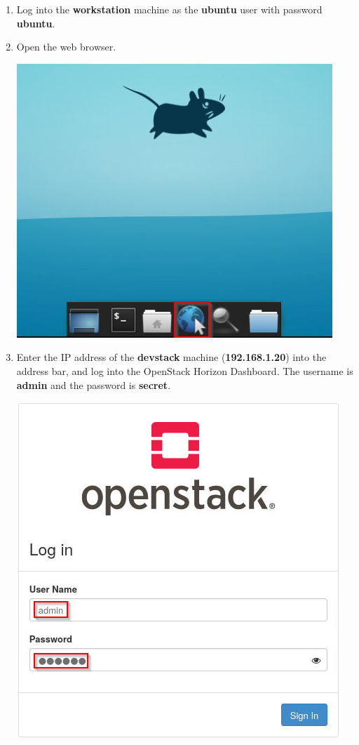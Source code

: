 \documentclass[letterpaper, 12pt]{article}
\begin{document}
\begin{enumerate}
    \item Log into the \textbf{workstation} machine as the \textbf{ubuntu} user with password \textbf{ubuntu}.

    \item Open the web browser.

    \begin{center}
    \includegraphics[scale=0.75]{images/part1/step2.png}
    \end{center}

    \item Enter the IP address of the \textbf{devstack} machine (\textbf{192.168.1.20}) into the address bar, and log
    into the OpenStack Horizon Dashboard. The username is \textbf{admin} and the password is \textbf{secret}.
    
    \begin{center}
        \includegraphics[scale=0.75]{images/part1/step3.png}
    \end{center}


\end{enumerate}
\end{document}

